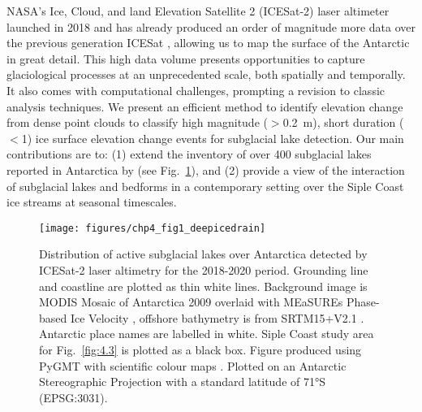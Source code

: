 NASA's Ice, Cloud, and land Elevation Satellite 2 (\gls{ICESat-2}) laser altimeter launched in 2018 \citep{MarkusIceCloudland2017,NeumannIceCloudLand2019} and has already produced an order of magnitude more data over the previous generation ICESat \citep[2003-2009;][]{ZwallyICESatlasermeasurements2002,ShumanICESatAntarcticelevation2006}, allowing us to map the surface of the Antarctic in great detail.
This high data volume presents opportunities to capture glaciological processes at an unprecedented scale, both spatially and temporally. %
It also comes with computational challenges, prompting a revision to classic analysis techniques.
We present an efficient method to identify elevation change from dense point clouds to classify high magnitude ($>$\SI{0.2}{\metre}), short duration ($<$\SI{1}{\year}) ice surface elevation change events for subglacial lake detection.
Our main contributions are to:
(1) extend the inventory of over 400 subglacial lakes reported in Antarctica by \citet{SiegfriedThirteenyearssubglacial2018} (see Fig.~\ref{fig:4.1}), and
(2) provide a view of the interaction of subglacial lakes and bedforms in a contemporary setting over the Siple Coast ice streams at seasonal timescales.

\begin{figure}[htbp]
  \texttt{[image: figures/chp4\_fig1\_deepicedrain]}
  \caption[Distribution of ICESat-2 active subglacial lakes from 2018-2020]{
    Distribution of active subglacial lakes over Antarctica detected by ICESat-2 laser altimetry for the 2018-2020 period.
    Grounding line and coastline \citep{DepoorterAntarcticmasksiceshelves2013} are plotted as thin white lines.
    Background image is MODIS Mosaic of Antarctica 2009 \citep{HaranMODISMosaicAntarctica2014} overlaid with MEaSUREs Phase-based Ice Velocity \citep{MouginotMEaSUREsPhaseMap2019}, offshore bathymetry is from SRTM15+V2.1 \citep{TozerGlobalBathymetryTopography2019}.
    Antarctic place names are labelled in white.
    Siple Coast study area for Fig.~\ref{fig:4.3} is plotted as a black box.
    Figure produced using PyGMT \citep{UiedaLeonardoPyGMTPythoninterface2020,WesselGenericMappingTools2019} with scientific colour maps \citep{CrameriScientificcolourmaps2018}.
    Plotted on an Antarctic Stereographic Projection with a standard latitude of 71°S (EPSG:3031).
  }
  \label{fig:4.1}
\end{figure}

